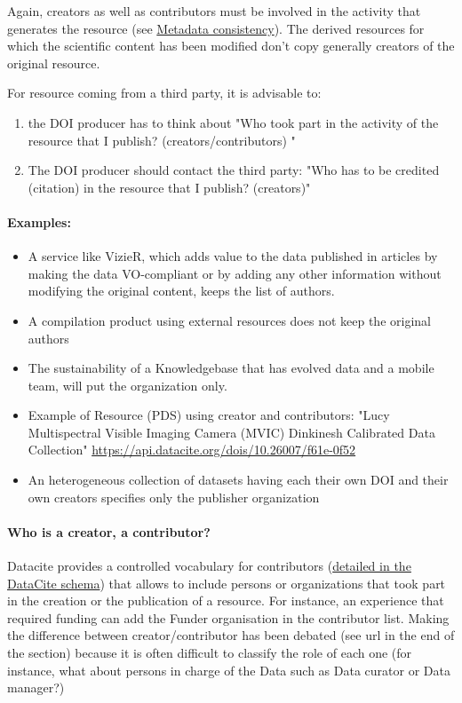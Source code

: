 \documentclass[11pt,a4paper]{ivoa}
\begin{document}
Again, creators as well as contributors must be involved in the activity that generates the resource (see \hyperlink{metadata-consistency}{Metadata consistency}). The derived resources for which the scientific content has been modified don't copy generally creators of the original resource.

For resource coming from a third party, it is advisable to:

\begin{enumerate}
\item{} the DOI producer has to think about 
"Who took part in the activity of the resource that I publish?  (creators/contributors) "
\item{} The DOI producer should contact the third party:
"Who has to be credited (citation) in the resource that I publish? (creators)"
\end{enumerate}

\paragraph{Examples:}

\begin{itemize}
\item{} A service like VizieR, which adds value to the data published in articles by making the data VO-compliant or by adding any other information without modifying the original content, keeps the list of authors.
\item{} A compilation product using external resources does not keep the original authors
\item{} The sustainability of a Knowledgebase that has evolved data and a mobile team, will put the organization only.
\item{} Example of Resource (PDS) using creator and contributors:\newline
"Lucy Multispectral Visible Imaging Camera (MVIC) Dinkinesh Calibrated Data Collection" \href{https://api.datacite.org/dois/10.26007/f61e-0f52}{https://api.datacite.org/dois/10.26007/f61e-0f52}
\item{} An heterogeneous collection of datasets having each their own DOI and their own creators specifies only the publisher organization
\end{itemize}

\paragraph{Who is a creator, a contributor?}
Datacite provides a controlled vocabulary for contributors (\href{https://datacite-metadata-schema.readthedocs.io/en/4.6/properties/contributor/}{detailed in the DataCite schema}) that  allows to include persons or organizations that took part in the creation or the publication of a resource. For instance, an experience that required funding can add the Funder organisation in the contributor list. \newline
Making the difference between creator/contributor has been debated (see url in the end of the section) because it is often difficult to classify the role of each one (for instance, what about persons in charge of the Data such as Data curator or Data manager?)\\
\end{document}
